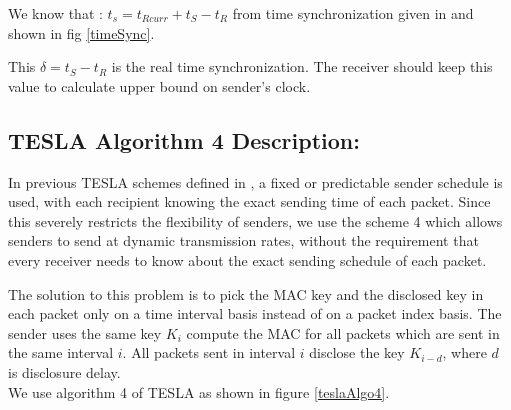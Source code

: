 We know that : $t_{s} = t_{Rcurr} + t_{S} - t_{R}$ from time synchronization given in \cite{perrig2002tesla} and shown in fig \ref{timeSync}.


This $ \delta= t_{S} - t_{R}$ is the real time synchronization. The receiver should keep this value to calculate upper bound on sender's clock. 



\subsection{TESLA Algorithm 4 Description:}
In previous TESLA schemes defined in \cite{perrig2000efficient}, a fixed or predictable sender schedule is used, with each recipient knowing the exact sending time of each packet. Since this severely restricts the flexibility of senders, we use the scheme 4 which allows senders to send at dynamic transmission rates, without the requirement that every receiver needs to know about the exact sending schedule of each packet. 

The solution to this problem is to pick the MAC key and the disclosed key in each packet only on a time interval basis instead of on a packet index basis. The sender uses the same key $K_{i}$ compute the MAC for all packets which are sent in the same interval $i$. All packets sent in interval $i$ disclose the key $K_{i-d}$, where $d$ is disclosure delay.\\

 We use algorithm 4 of TESLA\cite{perrig2000efficient} as shown in figure \ref{teslaAlgo4}.\\
 
